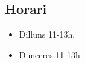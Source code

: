 \documentclass[../main.tex]{subfiles}
\begin{document}
\subsection*{Horari}
\begin{itemize}
    \item Dilluns 11-13h.
    \item Dimecres 11-13h
\end{itemize}
\end{document}
